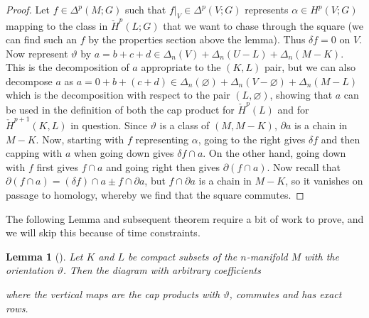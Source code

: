 \documentclass[reqno]{amsart}
\newtheorem{lemma}[theorem]{Lemma}
\theoremstyle{definition}
\theoremstyle{remark}
\begin{document}
\begin{proof}
          Let $f \in \Delta^{p} (M;G)$ such that
          $f|_{V} \in \Delta^{p}(V;G)$ represents
          $\alpha \in H^{p}(V;G)$ mapping to
          the class in $\check{H}^{p}(L;G)$ that we want
          to
          chase through the square (we can find such an $f$ by the
          properties section above the lemma).
          Thus $\delta f = 0$ on $V$.\\
          Now represent $\vartheta$ by $a = b+c+d \in 
          \Delta_n (V) + \Delta_n (U-L) + \Delta_n (M-K)$. This
          is the decomposition of $a$ appropriate to the
          $(K,L)$ pair, but we can also decompose
          $a$ as $a = 0 + b + (c+d) \in 
          \Delta_n (\varnothing) + \Delta_n (V - \varnothing)
          + \Delta_n (M - L)$ which is the decomposition
          with respect to the pair $(L, \varnothing)$, showing
          that $a$ can be used in the definition
          of both the cap product for
          $\check{H}^{p}(L)$ and for
          $\check{H}^{p+1}(K,L)$ in question. Since
          $\vartheta$ is a class of
          $(M, M-K)$, $\partial a$ is a chain in $M - K$. Now, starting
          with $f$ representing $\alpha$, going to the
          right gives $\delta f$ and then capping with $a$ when
          going down gives
          $\delta f \cap a$. On the other hand,
          going down with $f$ first gives $f \cap a$ and going
          right then gives $\partial \left( f \cap a \right) $.
          Now recall that
          $\partial \left( f \cap a \right) 
          = \left( \delta f \right) \cap a \pm f \cap \partial a$, but
          $f \cap \partial a$ is a chain in $M - K$, so it
          vanishes on passage to homology, whereby
          we find that the square commutes.
      \end{proof}

      The following Lemma and subsequent theorem require
      a bit of work to prove, and we will skip this because of time constraints.


      \begin{lemma}[]\cite[Lemma 8.2]{Bredon}
          Let $K$ and $L$ be compact subsets of the
          $n$-manifold $M$ with the orientation
          $\vartheta$. Then the diagram with arbitrary coefficients

      where the vertical maps are the cap products with
      $\vartheta$, commutes and has exact rows.
      \end{lemma}
\end{document}
